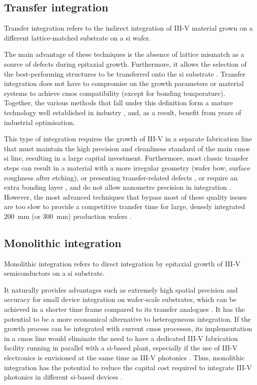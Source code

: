 \subsection{Transfer integration}

Transfer integration refers to the indirect integration of III-V material grown on a different lattice-matched substrate on a \acl{si} wafer. 

The main advantage of these techniques is the absence of lattice mismatch as a source of defects during epitaxial growth. Furthermore, it allows the selection of the best-performing structures to be transferred onto the \acl{si} substrate \cite{Zadeh2016, Wang2017}. Transfer integration does not have to compromise on the growth parameters or material systems to achieve \acs{cmos} compatibility (except for bonding temperature). Together, the various methods that fall under this definition form a mature technology well established in industry \cite{Koch2013, Han2022, Wang2017}, and, as a result, benefit from years of industrial optimisation.

This type of integration requires the growth of III-V in a separate fabrication line that must maintain the high precision and cleanliness standard of the main \acs{cmos} \acl{si} line, resulting in a large capital investment. Furthermore, most classic transfer steps can result in a material with a more irregular geometry (wafer bow, surface roughness after etching), or presenting transfer-related defects \cite{Jevtics2022}, or require an extra bonding layer \cite{Tang2019, Audet1997, Cheng2000, Sparks2001}, and do not allow nanometre precision in integration \cite{McPhillimy2020, Wang2017}. However, the most advanced techniques that bypass most of these quality issues are too slow to provide a competitive transfer time for large, densely integrated \qty{200}{\milli\metre} (or \qty{300}{\milli\metre}) production wafers \cite{McPhillimy2020, Wang2017}.

\subsection{Monolithic integration}

Monolithic integration refers to direct integration by epitaxial growth of III-V semiconductors on a \acl{si} substrate. 

It naturally provides advantages such as extremely high spatial precision and accuracy for small device integration on wafer-scale substrates, which can be achieved in a shorter time frame compared to its transfer analogues \cite{Wang2017, Wei2023}. It has the potential to be a more economical alternative to heterogeneous integration. If the growth process can be integrated with current \acs{cmos} processes, its implementation in a \acs{cmos} line would eliminate the need to have a dedicated III-V fabrication facility running in parallel with a \acl{si}-based plant, especially if the use of III-V electronics is envisioned at the same time as III-V photonics \cite{Wang2017}. Thus, monolithic integration has the potential to reduce the capital cost required to integrate III-V photonics in different \acl{si}-based devices \cite{Wang2017, Tang2019}.

